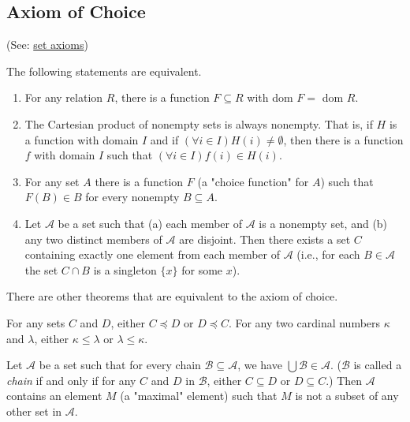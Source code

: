 \subsection{Axiom of Choice}\label{axiomofchoice}

(See: \hyperref[setaxioms]{set axioms})

\begin{theorem}
The following statements are equivalent.
\begin{enumerate}
  \item For any relation $R$, there is a function $F \subseteq R$ with dom $F =$ dom $R$.
  \item The Cartesian product of nonempty sets is always nonempty. That is, if $H$ is a function with
  domain $I$ and if $(\forall i \in I)H(i) \neq \emptyset$, then there is a function $f$ with domain $I$
  such that $(\forall i \in I) f(i) \in H(i).$
  \item For any set $A$ there is a function $F$ (a "choice function"\label{choicefunction} for $A$) such
  that $F(B) \in B$ for every nonempty $B \subseteq A$.
  \item Let $\mathcal{A}$ be a set such that (a) each member of $\mathcal{A}$ is a nonempty set, and (b) any 
  two distinct members of $\mathcal{A}$ are disjoint. Then there exists a set $C$ containing exactly one element
  from each member of $\mathcal{A}$ (i.e., for each $B \in \mathcal{A}$ the set $C \cap B$ is a singleton $\{ x \}$
  for some $x$).
\end{enumerate}
\end{theorem}

\noindent There are other theorems that are equivalent to the axiom of choice.

\begin{theorem}\label{cardinalcomparability}
For any sets $C$ and $D$, either $C \preceq D$ or $D \preceq C$. For any two cardinal numbers $\kappa$ and $\lambda$,
either $\kappa \leq \lambda$ or $\lambda \leq \kappa$.
\end{theorem}

\begin{theorem}\label{zornslemma}
Let $\mathcal{A}$ be a set such that for every chain $\mathcal{B} \subseteq \mathcal{A}$, we have $\bigcup \mathcal{B} \in \mathcal{A}$.
($\mathcal{B}$ is called a \emph{chain}\label{chain} if and only if for any $C$ and $D$ in $\mathcal{B}$, either $C \subseteq D$ or $D \subseteq C$.)
Then $\mathcal{A}$ contains an element $M$ (a "maximal" element) such that $M$ is not a subset of any other set in $\mathcal{A}$.
\end{theorem}